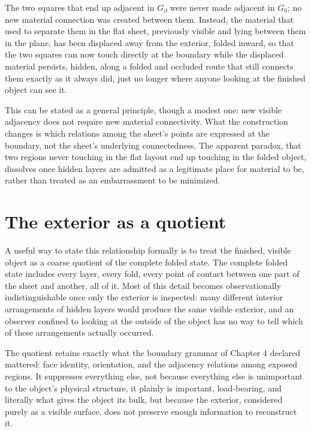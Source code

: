 \documentclass[11pt,oneside]{book}
\begin{document}
The two squares that end up adjacent in \(G_\partial\) were never made
adjacent in \(G_0\); no new material connection was created between
them. Instead, the material that used to separate them in the flat
sheet, previously visible and lying between them in the plane, has been
displaced away from the exterior, folded inward, so that the two squares
can now touch directly at the boundary while the displaced material
persists, hidden, along a folded and occluded route that still connects
them exactly as it always did, just no longer where anyone looking at
the finished object can see it.

This can be stated as a general principle, though a modest one: new
visible adjacency does not require new material connectivity. What the
construction changes is which relations among the sheet's points are
expressed at the boundary, not the sheet's underlying connectedness. The
apparent paradox, that two regions never touching in the flat layout end
up touching in the folded object, dissolves once hidden layers are
admitted as a legitimate place for material to be, rather than treated
as an embarrassment to be minimized.

\hypertarget{the-exterior-as-a-quotient}{%
\section{The exterior as a
quotient}\label{the-exterior-as-a-quotient}}

A useful way to state this relationship formally is to treat the
finished, visible object as a coarse quotient of the complete folded
state. The complete folded state includes every layer, every fold, every
point of contact between one part of the sheet and another, all of it.
Most of this detail becomes observationally indistinguishable once only
the exterior is inspected: many different interior arrangements of
hidden layers would produce the same visible exterior, and an observer
confined to looking at the outside of the object has no way to tell
which of these arrangements actually occurred.

The quotient retains exactly what the boundary grammar of Chapter 4
declared mattered: face identity, orientation, and the adjacency
relations among exposed regions. It suppresses everything else, not
because everything else is unimportant to the object's physical
structure, it plainly is important, load-bearing, and literally what
gives the object its bulk, but because the exterior, considered purely
as a visible surface, does not preserve enough information to
reconstruct it.
\end{document}
